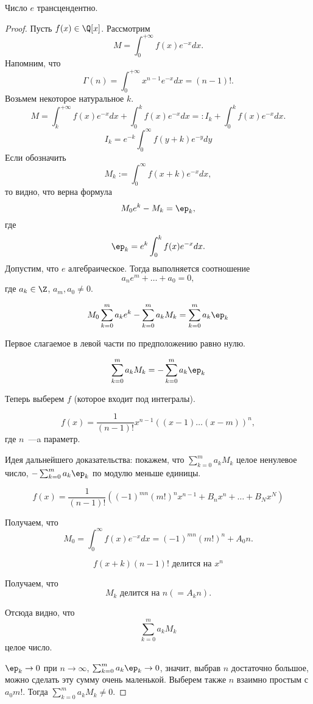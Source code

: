 \begin{theorem}
  Число $e$ трансцендентно.
\end{theorem}
\begin{proof}
  Пусть $f(x) \in \Q[x]$. Рассмотрим
  $$
    M = \int_0^{+\infty} f(x) e^{-x} dx.
  $$
  Напомним, что
  $$
    \Gamma(n) = \int_0^{+\infty} x^{n-1}e^{-x} dx = (n - 1)!.
  $$
  Возьмем некоторое натуральное $k$.
  $$
    M = \int_k^{+\infty} f(x) e^{-x} dx + \int_0^{k} f(x) e^{-x} dx =: I_k + \int_0^{k} f(x) e^{-x} dx.
  $$
  $$
    I_k = e^{-k} \int_0^{\infty} f(y + k) e^{-y} dy
  $$
  Если обозначить
  $$
    M_k := \int_0^{\infty} f(x + k) e^{-x} dx,
  $$
  то видно, что верна формула
  $$
    M_0e^{k} - M_k = \ep_k,
  $$
  где
  $$
    \ep_k = e^{k} \int_0^{k} f(x) e^{-x} dx.
  $$
    Допустим, что $e$ алгебраическое. Тогда выполняется соотношение
  $$
    a_n e^{m} + \ldots + a_0 = 0,
  $$
  где $a_k \in \Z$, $a_m, a_0 \ne 0$.
  
  $$
    M_0 \sum_{k=0}^{m} a_k e^k - \sum_{k=0}^{m} a_k M_k = \sum_{k=0}^{m} a_k \ep_k
  $$
  
  Первое слагаемое в левой части по предположению равно нулю.
  
  $$
    \sum_{k=0}^{m} a_k M_k = -\sum_{k=0}^{m} a_k \ep_k
  $$
  
  Теперь выберем $f$ (которое входит под интегралы).
  
  $$
    f(x) = \frac{1}{(n-1)!} x^{n-1}((x-1)\ldots(x-m))^n,
  $$
  где $n$~—a параметр.
  
  Идея дальнейшего доказательства: покажем, что $\sum_{k=0}^{m} a_k M_k$ целое ненулевое число, $-\sum_{k=0}^{m} a_k \ep_k$ по модулю меньше единицы.
  
  $$
    f(x) = \frac{1}{(n-1)!}((-1)^{mn}(m!)^n x^{n-1} + B_n x^n + \ldots + B_N x^N)
  $$
  
  Получаем, что
  $$
    M_0 = \int_0^{\infty} f(x) e^{-x} dx = (-1)^{mn}(m!)^n + A_0 n.
  $$
  
  $$
    f(x + k) (n - 1)! \mbox{ делится на $x^n$}
  $$
  
  Получаем, что
  $$
    M_k\mbox{ делится на $n$} (=A_k n).
  $$
  
  Отсюда видно, что
  $$
    \sum_{k=0}^{m} a_k M_k
  $$
  целое число.

  $\ep_k \to 0$ при $n \to \infty$, $\sum_{k=0}^{m} a_k \ep_k \to 0$, значит, выбрав $n$ достаточно большое, можно сделать эту сумму очень маленькой. Выберем также $n$ взаимно простым с $a_0 m!$. Тогда $\sum_{k=0}^{m} a_k M_k \ne 0$.
\end{proof}

